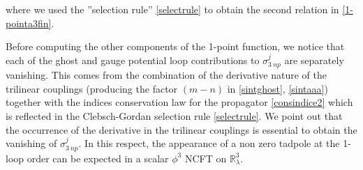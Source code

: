 \documentclass[a4paper,11pt]{article}
\numberwithin{equation}{section}
\theoremstyle{nonumberplain}
\begin{document}
where we used the ''selection rule'' \eqref{selectrule} to obtain the second relation in \eqref{1-pointa3fin}. \par 
Before computing the other components of the 1-point function, we notice that each of the ghost and gauge potential loop contributions to $\sigma^{j}_{3\ np}$ are separately vanishing. This comes from the combination of the derivative nature of the trilinear couplings (producing the factor $(m-n)$ in \eqref{sintghost}, \eqref{sintaaa}) together with the indices conservation law for the propagator \eqref{consindice2} which is reflected in the Clebsch-Gordan selection rule \eqref{selectrule}. We point out that the occurrence of the derivative in the trilinear couplings is essential to obtain the vanishing of $\sigma^{j}_{3\ np}$. In this respect, the appearance of a non zero tadpole at the 1-loop order can be expected in a scalar $\phi^3$ NCFT on $\mathbb{R}^3_\lambda$.\par 
\end{document}
